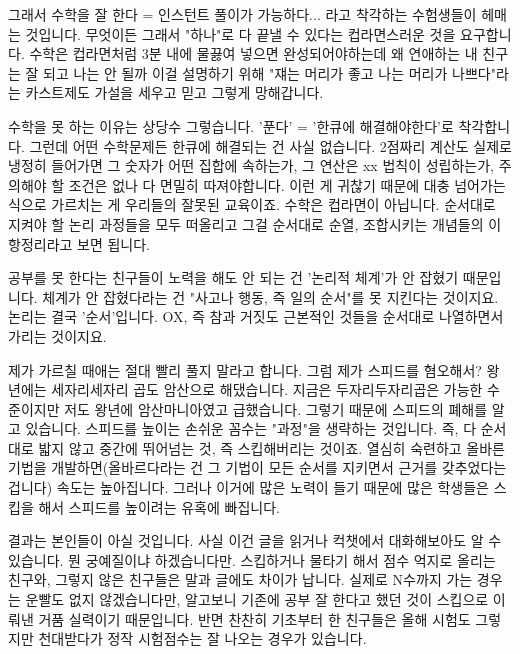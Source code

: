 그래서 수학을 잘 한다 = 인스턴트 풀이가 가능하다... 라고 착각하는 수험생들이 헤매는 것입니다.
무엇이든 그래서 "하나"로 다 끝낼 수 있다는 컵라면스러운 것을 요구합니다.
수학은 컵라면처럼 3분 내에 물끓여 넣으면 완성되어야하는데 왜 연애하는 내 친구는 잘 되고 나는 안 될까
이걸 설명하기 위해 "쟤는 머리가 좋고 나는 머리가 나쁘다"라는 카스트제도 가설을 세우고 믿고 그렇게 망해갑니다.
\vspace{5mm}

수학을 못 하는 이유는 상당수 그렇습니다. '푼다' = '한큐에 해결해야한다'로 착각합니다.
그런데 어떤 수학문제든 한큐에 해결되는 건 사실 없습니다. 2점짜리 계산도 실제로 냉정히 들어가면
그 숫자가 어떤 집합에 속하는가, 그 연산은 xx 법칙이 성립하는가, 주의해야 할 조건은 없나 다 면밀히 따져야합니다.
이런 게 귀찮기 때문에 대충 넘어가는 식으로 가르치는 게 우리들의 잘못된 교육이죠.
수학은 컵라면이 아닙니다.
순서대로 지켜야 할 논리 과정들을 모두 떠올리고 그걸 순서대로 순열, 조합시키는 개념들의 이항정리라고 보면 됩니다.
\vspace{5mm}

공부를 못 한다는 친구들이 노력을 해도 안 되는 건 '논리적 체계'가 안 잡혔기 때문입니다.
체계가 안 잡혔다라는 건 "사고나 행동, 즉 일의 순서"를 못 지킨다는 것이지요.
논리는 결국 '순서'입니다. OX, 즉 참과 거짓도 근본적인 것들을 순서대로 나열하면서 가리는 것이지요.
\vspace{5mm}

제가 가르칠 때애는 절대 빨리 풀지 말라고 합니다. 그럼 제가 스피드를 혐오해서?
왕년에는 세자리세자리 곱도 암산으로 해댔습니다. 지금은 두자리두자리곱은 가능한 수준이지만 저도 왕년에 암산마니아였고 급했습니다.
그렇기 때문에 스피드의 폐해를 알고 있습니다.
스피드를 높이는 손쉬운 꼼수는 "과정"을 생략하는 것입니다. 즉, 다 순서대로 밟지 않고 중간에 뛰어넘는 것, 즉 스킵해버리는 것이죠.
열심히 숙련하고 올바른 기법을 개발하면(올바르다라는 건 그 기법이 모든 순서를 지키면서 근거를 갖추었다는 겁니다) 속도는 높아집니다.
그러나 이거에 많은 노력이 들기 때문에 많은 학생들은 스킵을 해서 스피드를 높이려는 유혹에 빠집니다.
\vspace{5mm}

결과는 본인들이 아실 것입니다. 사실 이건 글을 읽거나 컥챗에서 대화해보아도 알 수 있습니다.
뭔 궁예질이냐 하겠습니다만. 스킵하거나 물타기 해서 점수 억지로 올리는 친구와, 그렇지 않은 친구들은 말과 글에도 차이가 납니다.
실제로 N수까지 가는 경우는 운빨도 없지 않겠습니다만, 알고보니 기존에 공부 잘 한다고 했던 것이 스킵으로 이뤄낸 거품 실력이기 때문입니다.
반면 찬찬히 기초부터 한 친구들은 올해 시험도 그렇지만 천대받다가 정작 시험점수는 잘 나오는 경우가 있습니다.
\vspace{5mm}

